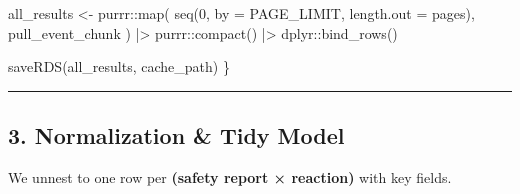 \documentclass[
  letterpaper,
  DIV=11,
  numbers=noendperiod]{scrartcl}
\newenvironment{Shaded}{\begin{snugshade}}{\end{snugshade}}
\newcommand{\AttributeTok}[1]{\textcolor[rgb]{0.40,0.45,0.13}{#1}}
\newcommand{\DecValTok}[1]{\textcolor[rgb]{0.68,0.00,0.00}{#1}}
\newcommand{\FunctionTok}[1]{\textcolor[rgb]{0.28,0.35,0.67}{#1}}
\newcommand{\NormalTok}[1]{\textcolor[rgb]{0.00,0.23,0.31}{#1}}
\newcommand{\OtherTok}[1]{\textcolor[rgb]{0.00,0.23,0.31}{#1}}
\newcommand{\SpecialCharTok}[1]{\textcolor[rgb]{0.37,0.37,0.37}{#1}}
\begin{document}
\begin{Shaded}
\begin{Highlighting}[]
\NormalTok{  all\_results }\OtherTok{\textless{}{-}}\NormalTok{ purrr}\SpecialCharTok{::}\FunctionTok{map}\NormalTok{(}
      \FunctionTok{seq}\NormalTok{(}\DecValTok{0}\NormalTok{, }\AttributeTok{by =}\NormalTok{ PAGE\_LIMIT, }\AttributeTok{length.out =}\NormalTok{ pages),}
\NormalTok{      pull\_event\_chunk}
\NormalTok{    ) }\SpecialCharTok{|\textgreater{}}
\NormalTok{    purrr}\SpecialCharTok{::}\FunctionTok{compact}\NormalTok{() }\SpecialCharTok{|\textgreater{}}
\NormalTok{    dplyr}\SpecialCharTok{::}\FunctionTok{bind\_rows}\NormalTok{()}

  \FunctionTok{saveRDS}\NormalTok{(all\_results, cache\_path)}
\NormalTok{\}}
\end{Highlighting}
\end{Shaded}

\begin{center}\rule{0.5\linewidth}{0.5pt}\end{center}

\subsection{3. Normalization \& Tidy
Model}\label{normalization-tidy-model}

We unnest to one row per \textbf{(safety report × reaction)} with key
fields.
\end{document}
